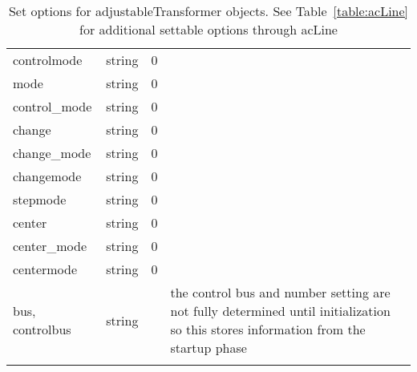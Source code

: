 \begin{longtable}{p{5cm} c c p{7cm}}
controlmode & string & 0 & \\
mode & string & 0 & \\
control\_mode & string & 0 & \\
change & string & 0 & \\
change\_mode & string & 0 & \\
changemode & string & 0 & \\
stepmode & string & 0 & \\
center & string & 0 & \\
center\_mode & string & 0 & \\
centermode & string & 0 & \\
bus, controlbus & string &  & the control bus and number setting are not fully determined until initialization so this stores information from the startup phase\\
\hline
\caption{Set options for adjustableTransformer objects. See Table~\ref{table:acLine} for additional settable options through acLine}
\label{table:adjustableTransformer}
\end{longtable}
